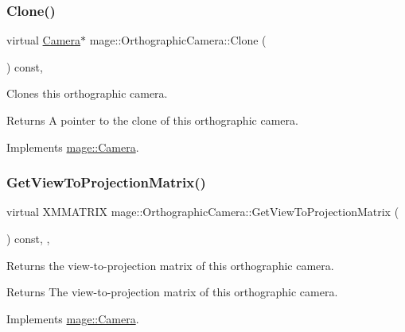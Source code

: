 \subsubsection{\texorpdfstring{Clone()}{Clone()}}
{\footnotesize\ttfamily virtual \hyperlink{classmage_1_1_camera}{Camera}$\ast$ mage\+::\+Orthographic\+Camera\+::\+Clone (\begin{DoxyParamCaption}{ }\end{DoxyParamCaption}) const\hspace{0.3cm}{\ttfamily [private]}, {\ttfamily [virtual]}}

Clones this orthographic camera.

\begin{DoxyReturn}{Returns}
A pointer to the clone of this orthographic camera. 
\end{DoxyReturn}


Implements \hyperlink{classmage_1_1_camera_a19301c2256c183db50b5e9406f7b5f3c}{mage\+::\+Camera}.

\hypertarget{classmage_1_1_orthographic_camera_aedd86e56a0f7bc967ad8d9be2631a0cf}{}\label{classmage_1_1_orthographic_camera_aedd86e56a0f7bc967ad8d9be2631a0cf} 
\subsubsection{\texorpdfstring{Get\+View\+To\+Projection\+Matrix()}{GetViewToProjectionMatrix()}}
{\footnotesize\ttfamily virtual X\+M\+M\+A\+T\+R\+IX mage\+::\+Orthographic\+Camera\+::\+Get\+View\+To\+Projection\+Matrix (\begin{DoxyParamCaption}{ }\end{DoxyParamCaption}) const\hspace{0.3cm}{\ttfamily [override]}, {\ttfamily [private]}, {\ttfamily [virtual]}}

Returns the view-\/to-\/projection matrix of this orthographic camera.

\begin{DoxyReturn}{Returns}
The view-\/to-\/projection matrix of this orthographic camera. 
\end{DoxyReturn}


Implements \hyperlink{classmage_1_1_camera_a1f5206864cf18b5548219492556df5d2}{mage\+::\+Camera}.

